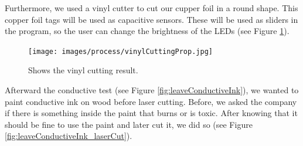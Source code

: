 \documentclass[00_doc.tex]{subfiles}
\begin{document}
    \noindent
    Furthermore, we used a vinyl cutter to cut our cupper foil in a round shape. This copper foil 
    tags will be used as capacitive sensors. These will be used as sliders in the program, so the 
    user can change the brightness of the LEDs (see Figure \ref{fig:vinylCuttingProp}).

    \begin{figure}[h!]
        \centering
        \texttt{[image: images/process/vinylCuttingProp.jpg]}
        \caption{Shows the vinyl cutting result.}
        \label{fig:vinylCuttingProp}
    \end{figure}

    \noindent
    Afterward the conductive test (see Figure \ref{fig:leaveConductiveInk}), we wanted to paint 
    conductive ink on wood before laser cutting. Before, we asked the company if there is 
    something inside the paint that burns or is toxic. After knowing that it should be fine to 
    use the paint and later cut it, we did so (see Figure \ref{fig:leaveConductiveInk_laserCut}). 
\end{document}
